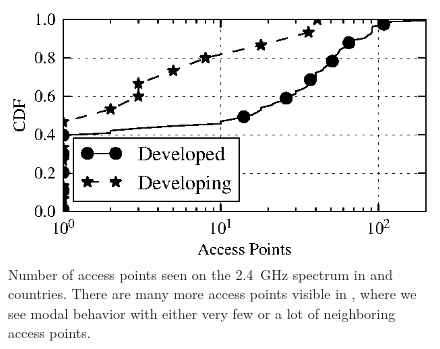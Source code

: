 \begin{figure}[t]
  \begin{minipage}{\linewidth}
  \includegraphics{figures/cdf_aps_all}
  \caption{Number of access points seen on the 2.4~GHz spectrum in \developed{} and \developing{} countries. There are many more access points visible in \developed{}, where we see modal behavior with either very few or a lot of neighboring access points.}
  \label{fig:cdf-aps}
  \end{minipage}
\end{figure}






